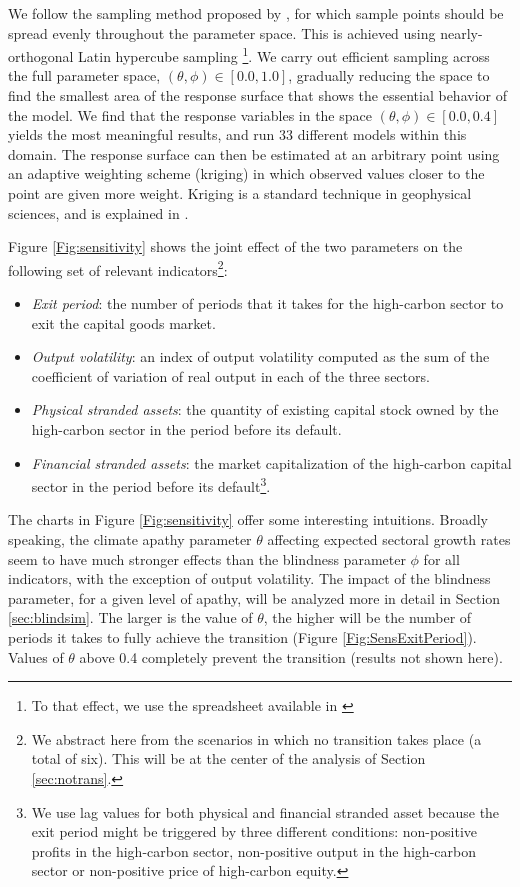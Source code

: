 \documentclass[authoryear]{article}
\begin{document}
We follow the sampling method proposed by \citet{Salle2014}, for which sample points should be spread evenly throughout the parameter space. This is achieved using nearly-orthogonal Latin hypercube sampling \citep{Cioppa2002}\footnote{To that effect, we use the spreadsheet available in \citet{Sanchez2005}}. We carry out efficient sampling across the full parameter space, $(\theta,\phi) \in [0.0,1.0]$, gradually reducing the space to find the smallest area of the response surface that shows the essential behavior of the model. We find that the response variables in the space $(\theta,\phi) \in [0.0,0.4]$ yields the most meaningful results, and run 33 different models within this domain. The response surface can then be estimated at an arbitrary point using an adaptive weighting scheme (kriging) in which observed values closer to the point are given more weight. Kriging is a standard technique in geophysical sciences, and is explained in \citet{Salle2014}.

Figure \ref{Fig:sensitivity} shows the joint effect of the two parameters on the following set of relevant indicators\footnote{We abstract here from the scenarios in which no transition takes place (a total of six). This will be at the center of the analysis of Section \ref{sec:notrans}.}:
\begin{itemize}[noitemsep,nolistsep,leftmargin=*]
\item\emph{Exit period}: the number of periods that it takes for the high-carbon sector to exit the capital goods market.  
\item \emph{Output volatility}: an index of output volatility computed as the sum of the coefficient of variation of real output in each of the three sectors.
\item \emph{Physical stranded assets}: the quantity of existing capital stock owned by the high-carbon sector in the period before its default.
\item \emph{Financial stranded assets}: the market capitalization of the high-carbon capital sector in the period before its default\footnote{We use  lag values for both physical and financial stranded asset because the exit period might be triggered by three different conditions: non-positive profits in the high-carbon sector, non-positive output in the high-carbon sector or non-positive price of high-carbon equity.}.
\end{itemize}

The charts in Figure \ref{Fig:sensitivity} offer some interesting intuitions. Broadly speaking, the climate apathy parameter $\theta$ affecting expected sectoral growth rates seem to have much stronger effects than the blindness parameter $\phi$ for all indicators, with the exception of output volatility. The impact of the blindness parameter, for a given level of apathy, will be analyzed more in detail in Section \ref{sec:blindsim}. The larger is the value of $\theta$, the higher will be the number of periods it takes to fully achieve the transition (Figure \ref{Fig:SensExitPeriod}). Values of $\theta$ above 0.4 completely prevent the transition (results not shown here).
\end{document}
